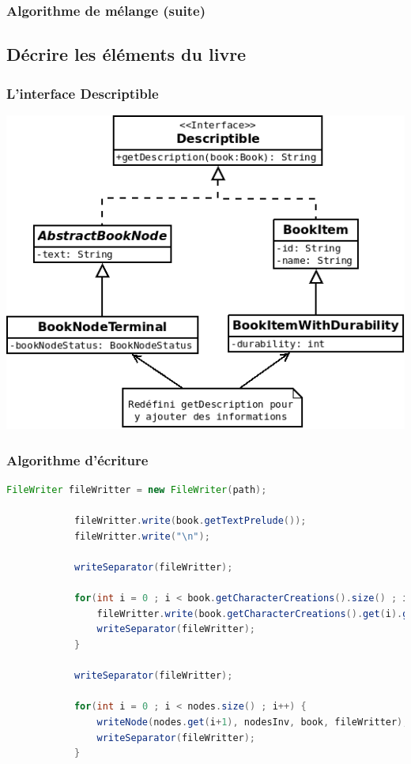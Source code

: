 \documentclass[beamer]{BetterDocument}
\begin{document}
	\begin{frame}
		\frametitle{Algorithme de mélange (suite)}

		\begin{algorithm}[H]
			\scriptsize
			\DontPrintSemicolon


			\;
		\end{algorithm}
	\end{frame}

	\subsection{Décrire les éléments du livre}
	\begin{frame}
		\frametitle{L'interface \textbf{Descriptible}}

		\center\includegraphics[height=0.7\paperheight, keepaspectratio]{img/descriptible.png}
	\end{frame}

	\begin{frame}[fragile]
		\frametitle{Algorithme d'écriture}

		\begin{lstlisting}[gobble=12, language=java,
    basicstyle=\ttfamily\fontsize{7}{9}\selectfont]
			FileWriter fileWritter = new FileWriter(path);

			fileWritter.write(book.getTextPrelude());
			fileWritter.write("\n");

			writeSeparator(fileWritter);

			for(int i = 0 ; i < book.getCharacterCreations().size() ; i++) {
				fileWritter.write(book.getCharacterCreations().get(i).getDescription(book));
				writeSeparator(fileWritter);
			}

			writeSeparator(fileWritter);

			for(int i = 0 ; i < nodes.size() ; i++) {
				writeNode(nodes.get(i+1), nodesInv, book, fileWritter);
				writeSeparator(fileWritter);
			}
		\end{lstlisting}
	\end{frame}
\end{document}
